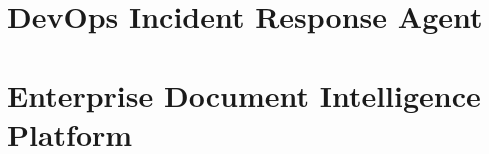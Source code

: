 \chapter{DevOps Incident Response Agent}
\label{ch:usecase-devops}


\chapter{Enterprise Document Intelligence Platform}
\label{ch:usecase-docs}



\backmatter

\printindex


